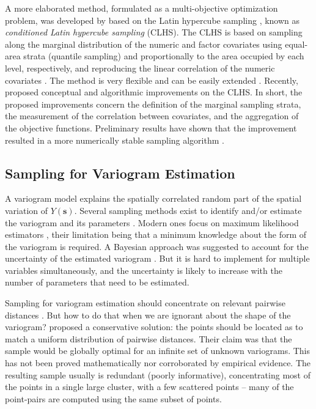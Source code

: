 A more elaborated method, formulated as a multi-objective optimization problem, was developed by 
\citet{MinasnyEtAl2006b} based on the Latin hypercube sampling \cite{McKayEtAl1979}, known as \emph{conditioned 
Latin hypercube sampling} (CLHS). The CLHS is based on sampling along the marginal distribution of the numeric 
and factor covariates using equal-area strata (quantile sampling) and proportionally to the area occupied by 
each level, respectively, and reproducing the linear correlation of the numeric covariates 
\cite{MinasnyEtAl2006b}. The method is very flexible and can be easily extended \cite{MinasnyEtAl2010a, 
RoudierEtAl2012}. Recently, \citet{Samuel-RosaEtAl2016} proposed conceptual and algorithmic improvements on 
the CLHS. In short, the proposed improvements concern the definition of the marginal sampling strata, the 
measurement of the correlation between covariates, and the aggregation of the objective functions. Preliminary 
results have shown that the improvement resulted in a more numerically stable sampling algorithm 
\citet{Samuel-RosaEtAl2016}.

\subsection{Sampling for Variogram Estimation}

A variogram model explains the spatially correlated random part of the spatial variation of 
$Y(\boldsymbol{s})$. Several sampling methods exist to identify and/or estimate the variogram and its 
parameters \cite{BrusEtAl1994, deGruijterEtAl2006, Mueller2007, WebsterEtAl2013}. Modern ones focus on maximum 
likelihood estimators \cite{Lark2002, Zimmerman2006, Mueller2007}, their limitation being that a minimum 
knowledge about the form of the variogram is required. A Bayesian approach was suggested to account for the 
uncertainty of the estimated variogram \cite{DiggleEtAl2006, MarchantEtAl2006, ZhuEtAl2006}. But it is hard to 
implement for multiple variables simultaneously, and the uncertainty is likely to increase with the number of 
parameters that need to be estimated.

Sampling for variogram estimation should concentrate on relevant pairwise distances \cite{MuellerEtAl1999, 
Lark2002}. But how to do that when we are ignorant about the shape of the variogram? \citet{BreslerEtAl1982, 
Russo1984, WarrickEtAl1987} proposed a conservative solution: the points should be located as to match a 
uniform distribution of pairwise distances. Their claim was that the sample would be globally optimal for an 
infinite set of unknown variograms. This has not been proved mathematically nor corroborated by empirical 
evidence. The resulting sample usually is redundant (poorly informative), concentrating most of the points in 
a single large cluster, with a few scattered points -- many of the point-pairs are computed using the same 
subset of points.

